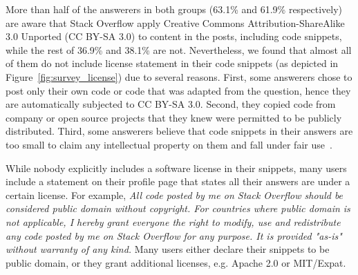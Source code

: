\documentclass{svjour3}                     %
\begin{document}
\vspace{0.5cm}
\noindent{}
\vspace{0.5cm}

More than half of the answerers in both groups (63.1\% and 61.9\% respectively)
are aware that Stack Overflow apply Creative Commons Attribution-ShareAlike 3.0
Unported (CC BY-SA 3.0) to content in the posts, including code snippets, while
the rest of 36.9\% and 38.1\% are not. Nevertheless, we found that almost all 
of them do not include license statement in their code snippets (as depicted in
Figure~\ref{fig:survey_license}) due to several reasons. First, some answerers chose to 
post only their own code or code that was adapted from the question, hence
they are automatically subjected to CC BY-SA 3.0. Second, they copied code from
company or open source projects that they knew were permitted to be publicly distributed.
Third, some answerers believe that code snippets in their answers are too small 
to claim any intellectual property on them and fall under fair use~\citep{fairuse}.

\vspace{0.5cm}
\noindent{}
\vspace{0.5cm}

While nobody explicitly includes a software license in their snippets,
many users include a statement on their profile page that states all their
answers are under a certain license. For example, \textit{All code posted by me on
	Stack Overflow should be considered public domain without copyright. For
	countries where public domain is not applicable, I hereby grant everyone the
	right to modify, use and redistribute any code posted by me on Stack Overflow
	for any purpose. It is provided "as-is" without warranty of any kind.}  Many
users either declare their snippets to be public domain, or they grant
additional licenses, e.g. Apache 2.0 or MIT/Expat.
\end{document}
